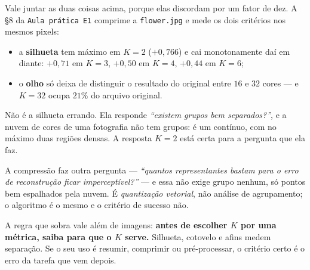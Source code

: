 \documentclass[11pt,a4paper]{article}
\begin{document}
\begin{atencao}
Vale juntar as duas coisas acima, porque elas discordam por um fator de dez. A §8 da
\texttt{Aula prática E1} comprime a \texttt{flower.jpg} e mede os dois critérios nos
mesmos pixels:

\begin{itemize}[leftmargin=1.2cm,nosep]
  \item a \textbf{silhueta} tem máximo em $K=2$ ($+0{,}766$) e cai monotonamente daí
        em diante: $+0{,}71$ em $K=3$, $+0{,}50$ em $K=4$, $+0{,}44$ em $K=6$;
  \item o \textbf{olho} só deixa de distinguir o resultado do original entre $16$ e
        $32$ cores --- e $K=32$ ocupa $21\%$ do arquivo original.
\end{itemize}

Não é a silhueta errando. Ela responde \emph{``existem grupos bem separados?''}, e a
nuvem de cores de uma fotografia não tem grupos: é um contínuo, com no máximo duas
regiões densas. A resposta $K=2$ está certa para a pergunta que ela faz.

A compressão faz outra pergunta --- \emph{``quantos representantes bastam para o erro
de reconstrução ficar imperceptível?''} --- e essa não exige grupo nenhum, só pontos
bem espalhados pela nuvem. É \emph{quantização vetorial}, não análise de
agrupamento; o algoritmo é o mesmo e o critério de sucesso não.

A regra que sobra vale além de imagens: \textbf{antes de escolher $K$ por uma
métrica, saiba para que o $K$ serve.} Silhueta, cotovelo e afins medem separação. Se
o seu uso é resumir, comprimir ou pré-processar, o critério certo é o erro da tarefa
que vem depois.
\end{atencao}

\end{document}

